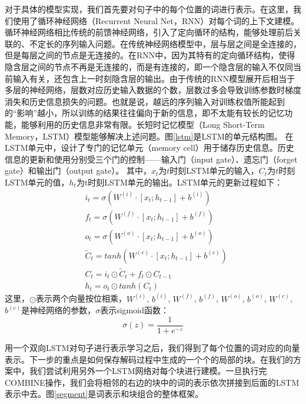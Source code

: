 对于具体的模型实现，我们首先要对句子中的每个位置的词进行表示。在这里，我们使用了循环神经网络（Recurrent Neural Net，RNN）对每个词的上下文建模。循环神经网络相比传统的前馈神经网络，引入了定向循环的结构，能够处理前后关联的、不定长的序列输入问题。在传统神经网络模型中，层与层之间是全连接的，但是每层之间的节点是无连接的。在RNN中，因为其特有的定向循环结构，使得隐含层之间的节点不再是无连接的，而是有连接的，即一个隐含层的输入不仅同当前输入有关，还包含上一时刻隐含层的输出。由于传统的RNN模型展开后相当于多层的神经网络，层数对应历史输入数据的个数，层数过多会导致训练参数时梯度消失和历史信息损失的问题。也就是说，越远的序列输入对训练权值所能起到的``影响''越小，所以训练的结果往往偏向于新的信息，即不太能有较长的记忆功能，能够利用的历史信息非常有限。长短时记忆模型（Long Short-Term Memory，LSTM）模型能够解决上述问题。图\ref{lstm}是LSTM的单元结构图。
在LSTM单元中，设计了专门的记忆单元（memory cell）用于储存历史信息。历史信息的更新和使用分别受三个门的控制——输入门（input gate）、遗忘门（forget gate）和输出门（output gate）。
其中，$x_t$为$t$时刻LSTM单元的输入，$C_t$为$t$时刻LSTM单元的值，$h_t$为t时刻LSTM单元的输出。LSTM单元的更新过程如下：
\begin{align}
& i_t = \sigma (W^{(i)}\cdot[x_t ; h_{t-1}]+b^{(i)})  \\
& f_t = \sigma (W^{(f)}\cdot[x_t ; h_{t-1}]+b^{(f)}) \\
& o_t = \sigma (W^{(o)}\cdot[x_t ; h_{t-1}]+b^{(o)})\\
& \tilde{C}_t = tanh(W^{(c)}\cdot[x_t ; h_{t-1}]+b^{(c)})\\%
& C_t = i_t \odot \tilde{C}_t + f_t \odot C_{t-1}\\
& h_t = o_t \odot tanh(C_t)
\end{align}
这里，$\odot$表示两个向量按位相乘，$W^{(i)}$, $b^{(i)}$, $W^{(f)}$, $b^{(f)}$, $W^{(o)}$, $b^{(o)}$, $W^{(c)}$, $b^{(c)}$是神经网络的参数，$\sigma$表示sigmoid函数：
\begin{equation}
\sigma(z) = \frac{1}{1+e^{-z}}
\end{equation}

用一个双向LSTM对句子进行表示学习之后，我们得到了每个位置的词对应的向量表示。下一步的重点是如何保存解码过程中生成的一个个的局部的块。在我们的方案中，我们尝试利用另外一个LSTM网络对每个块进行建模。一旦执行完COMBINE操作，我们会将相邻的右边的块中的词的表示依次拼接到后面的LSTM表示中去。图\ref{segment}是词表示和块组合的整体框架。

